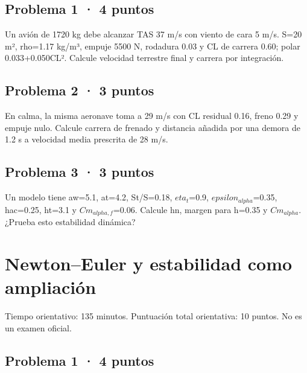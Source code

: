 \section{Problema 1 · 4 puntos}

Un avión de 1720 kg debe alcanzar TAS 37 m/s con viento de cara 5 m/s. S=20 m², rho=1.17 kg/m³, empuje 5500 N, rodadura 0.03 y CL de carrera 0.60; polar 0.033+0.050CL². Calcule velocidad terrestre final y carrera por integración.


\section{Problema 2 · 3 puntos}

En calma, la misma aeronave toma a 29 m/s con CL residual 0.16, freno 0.29 y empuje nulo. Calcule carrera de frenado y distancia añadida por una demora de 1.2 s a velocidad media prescrita de 28 m/s.


\section{Problema 3 · 3 puntos}

Un modelo tiene aw=5.1, at=4.2, St/S=0.18, $eta_{t}$=0.9, $epsilon_{alpha}$=0.35, hac=0.25, ht=3.1 y $Cm_{alpha,f}$=0.06. Calcule hn, margen para h=0.35 y $Cm_{alpha}$. ¿Prueba esto estabilidad dinámica?


\chapter{Newton--Euler y estabilidad como ampliación}

Tiempo orientativo: 135 minutos. Puntuación total orientativa: 10 puntos. No es un examen oficial.

\section{Problema 1 · 4 puntos}

